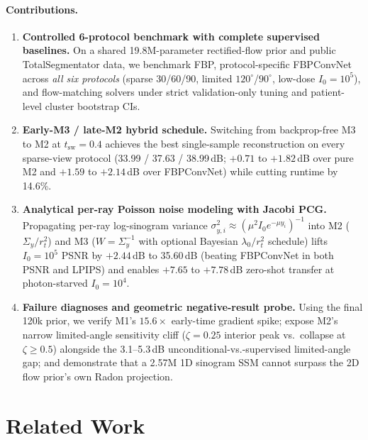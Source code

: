 \documentclass[11pt]{article}
\begin{document}
\paragraph{Contributions.}
\begin{enumerate}[leftmargin=*,nosep]
  \item \textbf{Controlled 6-protocol benchmark with complete supervised baselines.} On a shared 19.8M-parameter rectified-flow prior and public TotalSegmentator data, we benchmark FBP, protocol-specific FBPConvNet across \emph{all six protocols} (sparse 30/60/90, limited $120^\circ$/$90^\circ$, low-dose $I_0{=}10^5$), and flow-matching solvers under strict validation-only tuning and patient-level cluster bootstrap CIs.
  \item \textbf{Early-M3 / late-M2 hybrid schedule.} Switching from backprop-free M3 to M2 at $t_{\mathrm{sw}}{=}0.4$ achieves the best single-sample reconstruction on every sparse-view protocol (33.99 / 37.63 / 38.99\,dB; $+0.71$ to $+1.82$\,dB over pure M2 and $+1.59$ to $+2.14$\,dB over FBPConvNet) while cutting runtime by 14.6\%.
  \item \textbf{Analytical per-ray Poisson noise modeling with Jacobi PCG.} Propagating per-ray log-sinogram variance $\sigma_{y,i}^2\approx(\mu^2 I_0 e^{-\mu y_i})^{-1}$ into M2 ($\Sigma_y/r_t^2$) and M3 ($W{=}\Sigma_y^{-1}$ with optional Bayesian $\lambda_0/r_t^2$ schedule) lifts $I_0{=}10^5$ PSNR by $+2.44$\,dB to 35.60\,dB (beating FBPConvNet in both PSNR and LPIPS) and enables $+7.65$ to $+7.78$\,dB zero-shot transfer at photon-starved $I_0{=}10^4$.
  \item \textbf{Failure diagnoses and geometric negative-result probe.} Using the final 120k prior, we verify M1's $15.6\times$ early-time gradient spike; expose M2's narrow limited-angle sensitivity cliff ($\zeta{=}0.25$ interior peak vs.\ collapse at $\zeta{\ge}0.5$) alongside the 3.1--5.3\,dB unconditional-vs.-supervised limited-angle gap; and demonstrate that a 2.57M 1D sinogram SSM cannot surpass the 2D flow prior's own Radon projection.
\end{enumerate}

\section{Related Work}
\end{document}
